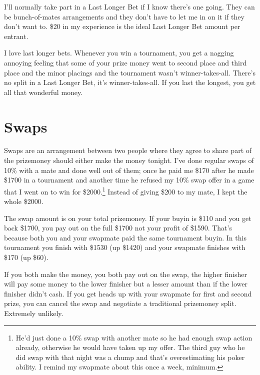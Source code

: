I'll normally take part in a Last Longer Bet if I know there's one
going. They can be bunch-of-mates arrangements and
they don't have to let me in on it if they don't want to. \$20 in my
experience is the ideal Last Longer Bet amount per entrant.

I love last longer bets. Whenever you win a tournament, you get a
nagging annoying feeling that some of your prize money went to second
place and third place and the minor placings and the tournament wasn't
winner-takes-all. There's no split in a Last Longer Bet, it's
winner-takes-all. If you last the longest, you get all that wonderful
money.
\newpage

\section{Swaps}


Swaps are an arrangement between two people where they
agree to share part of the prizemoney should
either make the money tonight. I've done regular swaps of 10\% with a mate and
done well out of them; once he paid me
\$170 after he made \$1700 in a tournament and another time
he refused my 10\% swap offer in a game that I
went on to win for \$2000.\footnote{He'd
just done a 10\% swap with another mate so he had enough swap action
already, otherwise he would have taken up my offer. The third
guy who he did swap with that night was a chump and that's
overestimating his poker ability. I remind my swapmate about this once
a week, minimum.} Instead of giving \$200 to my mate, I kept the whole
\$2000.

The swap amount is on your total prizemoney. If your buyin is
\$110 and you get back \$1700, you pay out on the full
\$1700 not your profit of \$1590. That's because both you and your
swapmate paid the same tournament buyin.
In this tournament you finish with \$1530 (up \$1420) and your swapmate
finishes with \$170 (up \$60).

If you both make the money, you both pay out on the swap, the
higher finisher will pay some money to the lower finisher but a lesser
amount than if the lower finisher didn't cash. If you get heads up
with your swapmate for first and second prize, you can cancel the swap
and negotiate a traditional prizemoney split. Extremely unlikely.

